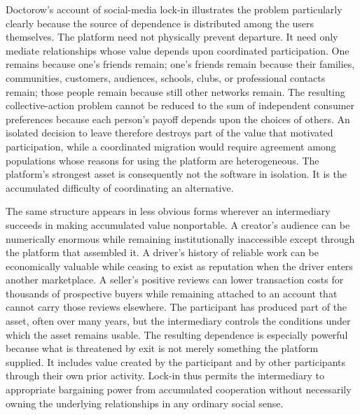 \documentclass[11pt]{article}
\begin{document}
Doctorow's account of social-media lock-in illustrates the problem particularly clearly because the source of dependence is distributed among the users themselves. The platform need not physically prevent departure. It need only mediate relationships whose value depends upon coordinated participation. One remains because one's friends remain; one's friends remain because their families, communities, customers, audiences, schools, clubs, or professional contacts remain; those people remain because still other networks remain. The resulting collective-action problem cannot be reduced to the sum of independent consumer preferences because each person's payoff depends upon the choices of others. An isolated decision to leave therefore destroys part of the value that motivated participation, while a coordinated migration would require agreement among populations whose reasons for using the platform are heterogeneous. The platform's strongest asset is consequently not the software in isolation. It is the accumulated difficulty of coordinating an alternative.

The same structure appears in less obvious forms wherever an intermediary succeeds in making accumulated value nonportable. A creator's audience can be numerically enormous while remaining institutionally inaccessible except through the platform that assembled it. A driver's history of reliable work can be economically valuable while ceasing to exist as reputation when the driver enters another marketplace. A seller's positive reviews can lower transaction costs for thousands of prospective buyers while remaining attached to an account that cannot carry those reviews elsewhere. The participant has produced part of the asset, often over many years, but the intermediary controls the conditions under which the asset remains usable. The resulting dependence is especially powerful because what is threatened by exit is not merely something the platform supplied. It includes value created by the participant and by other participants through their own prior activity. Lock-in thus permits the intermediary to appropriate bargaining power from accumulated cooperation without necessarily owning the underlying relationships in any ordinary social sense.
\end{document}
